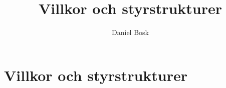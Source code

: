 \documentclass[a4paper,10pt,oneside,openright,
               oldfontcommands]{memoir}
\begin{document}
\title{%
  Villkor och styrstrukturer
}
\author{Daniel Bosk}

\maketitle

\begin{abstract}
  
\end{abstract}

\clearpage

\tableofcontents*

\chapter{Villkor och styrstrukturer}



\appendix


\printbibliography
\end{document}
